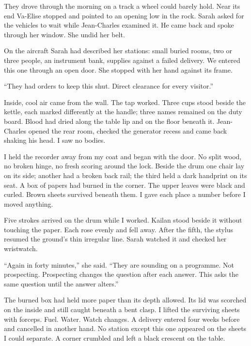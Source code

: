 They drove through the morning on a track a wheel could barely hold. Near its end Va-Elise stopped and pointed to an opening low in the rock. Sarah asked for the vehicles to wait while Jean-Charles examined it. He came back and spoke through her window. She undid her belt.\par

On the aircraft Sarah had described her stations: small buried rooms, two or three people, an instrument bank, supplies against a failed delivery. We entered this one through an open door. She stopped with her hand against its frame.\par

``They had orders to keep this shut. Direct clearance for every visitor.''\par

Inside, cool air came from the wall. The tap worked. Three cups stood beside the kettle, each marked differently at the handle; three names remained on the duty board. Blood had dried along the table lip and on the floor beneath it. Jean-Charles opened the rear room, checked the generator recess and came back shaking his head. I saw no bodies.\par

I held the recorder away from my coat and began with the door. No split wood, no broken hinge, no fresh scoring around the lock. Beside the drum one chair lay on its side; another had a broken back rail; the third held a dark handprint on its seat. A box of papers had burned in the corner. The upper leaves were black and curled. Brown sheets survived beneath them. I gave each place a number before I moved anything.\par

Five strokes arrived on the drum while I worked. Kailan stood beside it without touching the paper. Each rose evenly and fell away. After the fifth, the stylus resumed the ground's thin irregular line. Sarah watched it and checked her wristwatch.\par

``Again in forty minutes,'' she said. ``They are sounding on a programme. Not prospecting. Prospecting changes the question after each answer. This asks the same question until the answer alters.''\par

The burned box had held more paper than its depth allowed. Its lid was scorched on the inside and still caught beneath a bent clasp. I lifted the surviving sheets with forceps. Fuel. Water. Watch changes. A delivery entered four weeks before and cancelled in another hand. No station except this one appeared on the sheets I could separate. A corner crumbled and left a black crescent on the table.\par

